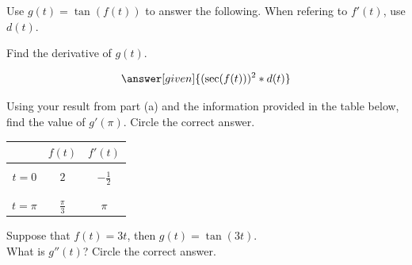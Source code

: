 \documentclass[handout]{ximera}
\begin{document}
\begin{problem}
Use $g(t)=\tan(f(t))$ to answer the following. When refering to $f'(t)$, use $d(t)$.

	\begin{question}
	Find the derivative of $g(t)$.
	
    \[
    \answer[given]{(\sec(f(t)))^2 * d(t)}
    \]
    \end{question}
    
	
	\begin{question}
    Using your result from part (a) and the information provided in the table below, find the value of $g'(\pi)$. Circle the correct answer.

    \begin{tabular}{c|c|c}
	\@ & $f(t)$ & $f'(t)$\\
	\hline
	\hline
	\@ & \@ & \@ \\
	$t=0$ & $2$ & $\displaystyle-\frac{1}{2}$\\
	\@ & \@ & \@ \\
	\hline
	\@ & \@ & \@ \\
	$t=\pi$ & $\displaystyle\frac{\pi}{3}$ & $\pi$\\
	
    \end{tabular}
	
    \begin{multipleChoice}
    \end{multipleChoice}
    \end{question}
\end{problem}



\begin{problem}
Suppose that $f(t)=3t$, then $g(t)=\tan(3t)$.\\

What is $g''(t)$? Circle the correct answer.

\begin{multipleChoice}
\end{multipleChoice}
\end{problem}
\end{document}
